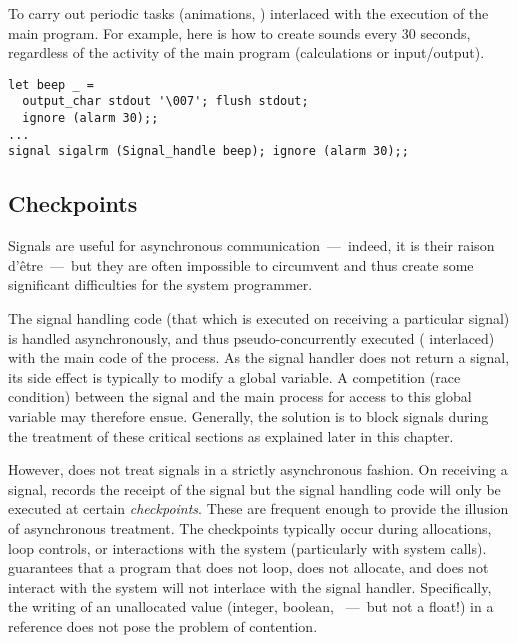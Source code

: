 \begin{example} 
\label{ex/beep}
To carry out periodic tasks (animations, \etc) interlaced with
the execution of the main program.  For example, here is how
to create  sounds every 30 seconds, regardless of
the activity of the main program (calculations or input/output).

\begin{lstlisting}
let beep _ = 
  output_char stdout '\007'; flush stdout; 
  ignore (alarm 30);;
...
signal sigalrm (Signal_handle beep); ignore (alarm 30);;
\end{lstlisting}
\end{example}

\subsection*{Checkpoints}

Signals are useful for asynchronous communication~---~indeed, it is their 
raison d'\^etre~---~but they are often impossible to 
circumvent and thus create some significant difficulties for the
system programmer.

The signal handling code (that which is executed on 
receiving a particular signal) is handled asynchronously, and thus 
pseudo-concurrently executed (\ie{} interlaced) with the main 
code of the process.  As the signal handler does not return
a signal, its side effect is typically to modify a global variable.
A competition (race condition) between the signal and the main process
for access to this global variable may therefore ensue.  Generally, the solution
is to block signals during the treatment of these critical sections as 
explained later in this chapter.  

However, {\ocaml} does not treat signals in a strictly asynchronous
fashion.  On receiving a signal, {\ocaml} records the receipt of the
signal but the signal handling code will only be executed at certain
\emph{checkpoints}.  These are frequent enough to provide the illusion
of asynchronous treatment.  The checkpoints typically occur during
allocations, loop controls, or interactions with the system
(particularly with system calls). {\ocaml} guarantees that a program
that does not loop, does not allocate, and does not interact with the
system will not interlace with the signal handler.  Specifically, the
writing of an unallocated value (integer, boolean, \etc{}~---~but not
a float!) in a reference does not pose the problem of contention.

